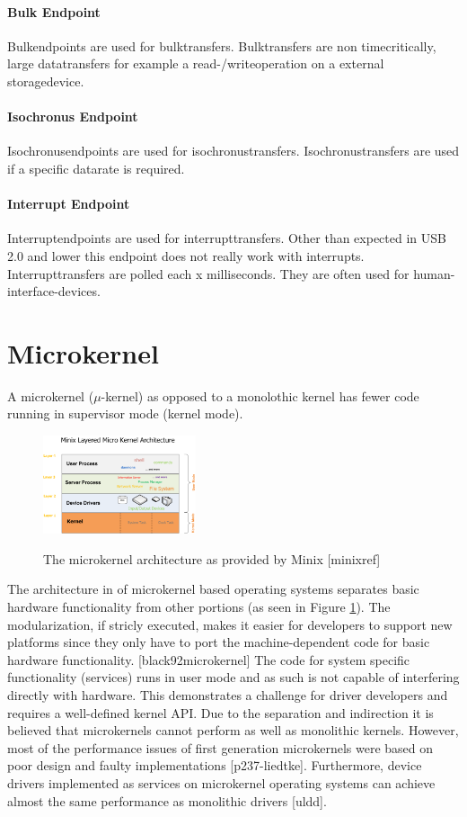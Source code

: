 \documentclass{acm_proc_article-sp}
\begin{document}
\paragraph{Bulk Endpoint}
Bulkendpoints are used for bulktransfers. Bulktransfers are non timecritically, large datatransfers for example a read-/writeoperation on a external storagedevice.
\paragraph{Isochronus Endpoint}
Isochronusendpoints are used for isochronustransfers. Isochronustransfers are used if a specific datarate is required.
\paragraph{Interrupt Endpoint}
Interruptendpoints are used for interrupttransfers. Other than expected in USB 2.0 and lower this endpoint does not really work with interrupts. Interrupttransfers are polled each x milliseconds. They are often used for human-interface-devices.
\section{Microkernel}
A microkernel ($\mu$-kernel) as opposed to a monolothic kernel has fewer code running in
supervisor mode (kernel mode).
\begin{figure}
\centering
\includegraphics[width=0.4\textwidth]{minixinternalstructure.png}
\label{fig:minixmicarch}
\caption{The microkernel architecture as provided by Minix [minixref]}
\end{figure}
The architecture in of microkernel based operating systems separates basic
hardware functionality from other portions (as seen in Figure \ref{fig:minixmicarch}).
The modularization, if stricly executed, makes it easier for developers to support new
platforms since they only have to port the machine-dependent code for basic hardware functionality.
[black92microkernel]
The code for system specific functionality (services) runs in user mode and as such
is not capable of interfering directly with hardware.
This demonstrates a challenge for driver developers and requires a well-defined kernel API.
Due to the separation and indirection it is believed that microkernels cannot perform as well as
monolithic kernels.
However, most of the performance issues of first generation microkernels were based on poor design
and faulty implementations [p237-liedtke].
Furthermore, device drivers implemented as services on microkernel operating systems can achieve
almost the same performance as monolithic drivers [uldd].
\end{document}
